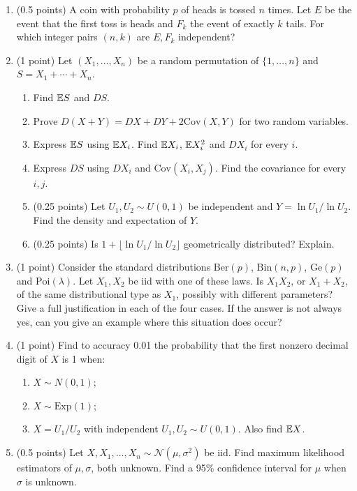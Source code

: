 \documentclass[a4paper]{report}
\begin{document}
\begin{problem}
\begin{enumerate}
\item (0.5 points) A coin with probability $p$ of heads is tossed $n$ times. Let $E$ be the event that the first toss is heads and $F_k$ the event of exactly $k$ tails. For which integer pairs $(n,k)$ are $E,F_k$ independent?
\item (1 point) Let $(X_1,\ldots,X_n)$ be a random permutation of $\{1,\ldots,n\}$ and $S=X_1+\cdots+X_n$.
\begin{enumerate}
\item Find $\mathbb {E} S$ and $DS$.
\item Prove $D(X+Y)=DX+DY+2\mathrm{Cov}(X,Y)$ for two random variables.
\item Express $\mathbb {E} S$ using $\mathbb {E} X_i$. Find $\mathbb {E} X_i$, $\mathbb {E} X_i^2$ and $DX_i$ for every $i$.
\item Express $DS$ using $DX_i$ and $\mathrm{Cov}(X_i,X_j)$. Find the covariance for every $i,j$.
\item (0.25 points) Let $U_1,U_2\sim U(0,1)$ be independent and $Y=\ln U_1/\ln U_2$. Find the density and expectation of $Y$.
\item (0.25 points) Is $1+\lfloor\ln U_1/\ln U_2\rfloor$ geometrically distributed? Explain.
\end{enumerate}
\item (1 point) Consider the standard distributions $\mathrm{Ber}(p)$, $\mathrm{Bin}(n,p)$, $\mathrm{Ge}(p)$ and $\mathrm{Poi}(\lambda)$. Let $X_1,X_2$ be iid with one of these laws. Is $X_1X_2$, or $X_1+X_2$, of the same distributional type as $X_1$, possibly with different parameters? Give a full justification in each of the four cases. If the answer is not always yes, can you give an example where this situation does occur?
\item (1 point) Find to accuracy 0.01 the probability that the first nonzero decimal digit of $X$ is 1 when:
\begin{enumerate}
\item $X\sim N(0,1)$;
\item $X\sim\mathrm{Exp}(1)$;
\item $X=U_1/U_2$ with independent $U_1,U_2\sim U(0,1)$. Also find $\mathbb {E} X$.
\end{enumerate}
\item (0.5 points) Let $X,X_1,\ldots,X_n\sim\mathcal N(\mu,\sigma^2)$ be iid. Find maximum likelihood estimators of $\mu,\sigma$, both unknown. Find a 95\% confidence interval for $\mu$ when $\sigma$ is unknown.
\end{enumerate}
\end{problem}
\end{document}
